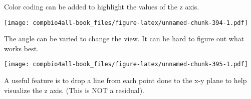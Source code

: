 \documentclass[
]{book}
\newenvironment{Shaded}{\begin{snugshade}}{\end{snugshade}}
\newcommand{\AttributeTok}[1]{\textcolor[rgb]{0.77,0.63,0.00}{#1}}
\newcommand{\ConstantTok}[1]{\textcolor[rgb]{0.00,0.00,0.00}{#1}}
\newcommand{\DecValTok}[1]{\textcolor[rgb]{0.00,0.00,0.81}{#1}}
\newcommand{\FunctionTok}[1]{\textcolor[rgb]{0.00,0.00,0.00}{#1}}
\newcommand{\NormalTok}[1]{#1}
\newcommand{\SpecialCharTok}[1]{\textcolor[rgb]{0.00,0.00,0.00}{#1}}
\newcommand{\StringTok}[1]{\textcolor[rgb]{0.31,0.60,0.02}{#1}}
\begin{document}
Color coding can be added to highlight the values of the z axis.

\begin{Shaded}
\end{Shaded}

\texttt{[image: compbio4all-book\_files/figure-latex/unnamed-chunk-394-1.pdf]}

The angle can be varied to change the view. It can be hard to figure out what works best.

\begin{Shaded}
\end{Shaded}

\texttt{[image: compbio4all-book\_files/figure-latex/unnamed-chunk-395-1.pdf]}

A useful feature is to drop a line from each point done to the x-y plane to help visualize the z axis. (This is NOT a residual).

\begin{Shaded}
\end{Shaded}
\end{document}

